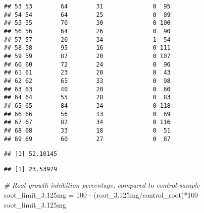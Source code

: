 \documentclass[
]{article}
\newenvironment{Shaded}{\begin{snugshade}}{\end{snugshade}}
\newcommand{\CommentTok}[1]{\textcolor[rgb]{0.56,0.35,0.01}{\textit{#1}}}
\newcommand{\DecValTok}[1]{\textcolor[rgb]{0.00,0.00,0.81}{#1}}
\newcommand{\FloatTok}[1]{\textcolor[rgb]{0.00,0.00,0.81}{#1}}
\newcommand{\FunctionTok}[1]{\textcolor[rgb]{0.00,0.00,0.00}{#1}}
\newcommand{\NormalTok}[1]{#1}
\newcommand{\OtherTok}[1]{\textcolor[rgb]{0.56,0.35,0.01}{#1}}
\newcommand{\SpecialCharTok}[1]{\textcolor[rgb]{0.00,0.00,0.00}{#1}}
\begin{document}
\begin{verbatim}
## 53 53        64        31              0  95
## 54 54        64        25              0  89
## 55 55        70        30              0 100
## 56 56        64        26              0  90
## 57 57        20        34              1  54
## 58 58        95        16              0 111
## 59 59        87        20              0 107
## 60 60        72        24              0  96
## 61 61        23        20              0  43
## 62 62        65        33              0  98
## 63 63        40        20              0  60
## 64 64        55        28              0  83
## 65 65        84        34              0 118
## 66 66        56        13              0  69
## 67 67        82        34              0 116
## 68 68        33        18              0  51
## 69 69        60        27              0  87
\end{verbatim}

\begin{Shaded}
\end{Shaded}

\begin{verbatim}
## [1] 52.10145
\end{verbatim}

\begin{Shaded}
\end{Shaded}

\begin{verbatim}
## [1] 23.53979
\end{verbatim}

\begin{Shaded}
\begin{Highlighting}[]
\CommentTok{\# Root growth inhibition percentage, compared to control sample}
\NormalTok{root\_limit\_3}\FloatTok{.125}\NormalTok{mg }\OtherTok{=} \DecValTok{100} \SpecialCharTok{{-}}\NormalTok{ (root\_3}\FloatTok{.125}\NormalTok{mg}\SpecialCharTok{/}\NormalTok{control\_root)}\SpecialCharTok{*}\DecValTok{100}
\NormalTok{root\_limit\_3}\FloatTok{.125}\NormalTok{mg}
\end{Highlighting}
\end{Shaded}
\end{document}
